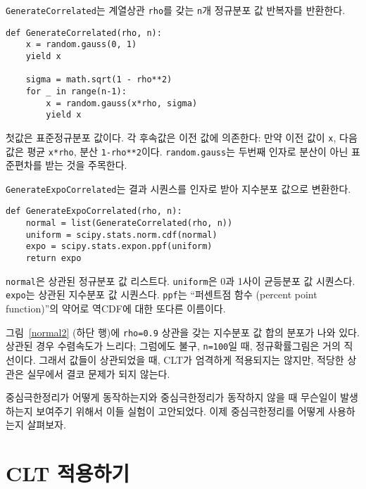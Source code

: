 {\tt GenerateCorrelated}는 계열상관 {\tt rho}를 갖는 {\tt n}개 정규분포 값 반복자를 반환한다.

\begin{verbatim}
def GenerateCorrelated(rho, n):
    x = random.gauss(0, 1)
    yield x

    sigma = math.sqrt(1 - rho**2)
    for _ in range(n-1):
        x = random.gauss(x*rho, sigma)
        yield x
\end{verbatim}

첫값은 표준정규분포 값이다. 각 후속값은 이전 값에 의존한다: 만약 이전 값이 {\tt x}, 다음값은 평균 {\tt x*rho}, 분산 {\tt 1-rho**2}이다. 
{\tt random.gauss}는 두번째 인자로 분산이 아닌 표준편차를 받는 것을 주목한다.

{\tt GenerateExpoCorrelated}는 결과 시퀀스를 인자로 받아 지수분포 값으로 변환한다.

\begin{verbatim}
def GenerateExpoCorrelated(rho, n):
    normal = list(GenerateCorrelated(rho, n))
    uniform = scipy.stats.norm.cdf(normal)
    expo = scipy.stats.expon.ppf(uniform)
    return expo
\end{verbatim}

{\tt normal}은 상관된 정규분포 값 리스트다.
{\tt uniform}은 0과 1사이 균등분포 값 시퀀스다.
{\tt expo}는 상관된 지수분포 값 시퀀스다.
{\tt ppf}는 ``퍼센트점 함수 (percent point function)''의 약어로 역CDF에 대한 또다른 이름이다.


그림~\ref{normal2} (하단 행)에 {\tt rho=0.9} 상관을 갖는 지수분포 값 합의 분포가 나와 있다. 상관된 경우 수렴속도가 느리다; 그럼에도 불구, {\tt n=100}일 때, 정규확률그림은 거의 직선이다. 그래서 값들이 상관되었을 때, CLT가 엄격하게 적용되지는 않지만, 적당한 상관은 실무에서 결코 문제가 되지 않는다.

중심극한정리가 어떻게 동작하는지와 중심극한정리가 동작하지 않을 때 무슨일이 발생하는지 보여주기 위해서 이들 실험이 고안되었다. 이제 중심극한정리를 어떻게 사용하는지 살펴보자.


\section{CLT 적용하기}
\label{usingCLT}


